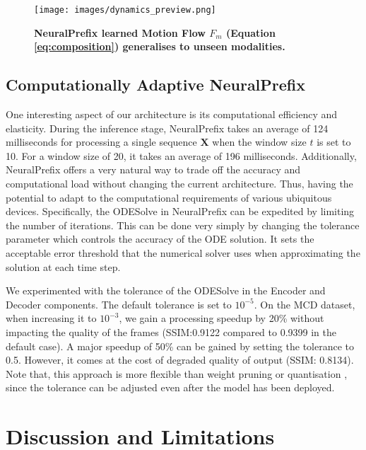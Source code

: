 \documentclass[10pt, conference, compsocconf]{IEEEtran}
\def\update#1{#1}
\begin{document}
\begin{figure}[t!]
    \centering
    \texttt{[image: images/dynamics\_preview.png]}
    \caption{\textbf{NeuralPrefix learned Motion Flow $F_m$ (Equation \ref{eq:composition})  generalises to unseen modalities. }}
    \label{fig:motion_flow}
\end{figure}



\subsection{Computationally Adaptive NeuralPrefix}
\label{sec:comp_adaptive}

\update{One interesting aspect of our architecture is its computational efficiency and elasticity. During the inference stage, NeuralPrefix takes an average of 124 milliseconds for processing a single sequence $\mathbf{X}$ when the window size $t$ is set to 10. For a window size of 20, it takes an average of 196 milliseconds. Additionally, NeuralPrefix offers a very natural way to trade off the accuracy and computational load without changing the current architecture. Thus, having the potential to adapt to the computational requirements of various ubiquitous devices.} Specifically, the ODESolve in NeuralPrefix can be expedited by limiting the number of iterations. This can be done very simply by changing the tolerance parameter which controls the accuracy of the ODE solution. It sets the acceptable error threshold that the numerical solver uses when approximating the solution at each time step. 


We experimented with the tolerance of the ODESolve in the Encoder and Decoder components. The default tolerance is set to $10^{-5}$. On the MCD dataset, when increasing it to $10^{-3}$,  we gain a processing speedup by 20\% without impacting the quality of the frames (SSIM:0.9122 compared to 0.9399 in the default case). A major speedup of 50\% can be gained by setting the tolerance to 0.5. \update{However,} it comes at the cost of degraded quality of output (SSIM: 0.8134). Note that, this approach is more flexible than weight pruning or quantisation \cite {cheng2024survey}, since the tolerance can be adjusted even after the model has been deployed.



\section{Discussion and Limitations}
\label{sec:dicussion}
\end{document}

